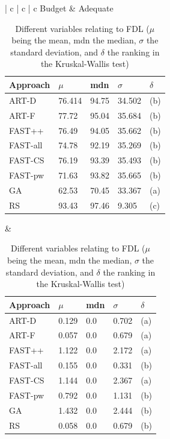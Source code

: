 \begin{table}[htpb]
	\caption[FDL statistical results]{Different variables relating to FDL ($\mu$ being the mean, mdn the median, $\sigma$ the standard deviation, and $\delta$ the ranking in the Kruskal-Wallis test)}\label{tab:fdl_stats}
	\centering
	\begin{tabular}{| c | c | c}
	\midrule
	Budget & Adequate \\
	\midrule
	{\begin{tabular}{l | l | l | l | l}
		Approach & $\mu$ & mdn & $\sigma$ & $\delta$ \\
		\midrule
		ART-D & 76.414 & 94.75 & 34.502 & (b) \\
		ART-F & 77.72 & 95.04 & 35.684 & (b) \\
		FAST++ & 76.49 & 94.05 & 35.662 & (b) \\
		FAST-all & 74.78 & 92.19 & 35.269 & (b) \\
		FAST-CS & 76.19 & 93.39 & 35.493 & (b) \\
		FAST-pw & 71.63 & 93.82 & 35.665 & (b) \\
		GA & 62.53 & 70.45 & 33.367 & (a) \\
		RS & 93.43 & 97.46 & 9.305 & (c) \\
	\end{tabular}} &
	{ \begin{tabular}{l | l | l | l | l}
		Approach & $\mu$ & mdn & $\sigma$ & $\delta$ \\
		\midrule
		ART-D & 0.129 & 0.0 & 0.702 & (a) \\
		ART-F & 0.057 & 0.0 & 0.679 & (a) \\
		FAST++ & 1.122 & 0.0 & 2.172 & (a) \\
		FAST-all & 0.155 & 0.0 & 0.331 & (b) \\
		FAST-CS & 1.144 & 0.0 & 2.367 & (a) \\
		FAST-pw & 0.792 & 0.0 & 1.131 & (b) \\
		GA & 1.432 & 0.0 & 2.444 & (b) \\
		RS & 0.058 & 0.0 & 0.679 & (b) \\
	\end{tabular}} \\
	\bottomrule
	\end{tabular}
\end{table}

